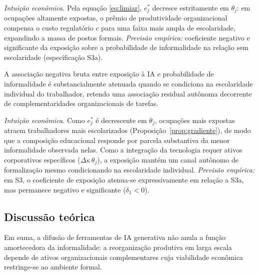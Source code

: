 \textit{Intuição econômica.} Pela equação \eqref{eq:limiar}, $e^*_j$ decresce estritamente em $\theta_j$: em ocupações altamente expostas, o prêmio de produtividade organizacional compensa o custo regulatório $c$ para uma faixa mais ampla de escolaridade, expandindo a massa de postos formais. \emph{Previsão empírica:} coeficiente negativo e significante da exposição sobre a probabilidade de informalidade na relação sem escolaridade (especificação S3a).

\begin{corolario}
\label{cor:mediacao}
A associação negativa bruta entre exposição à IA e probabilidade de informalidade é substancialmente atenuada quando se condiciona na escolaridade individual do trabalhador, retendo uma associação residual autônoma decorrente de complementaridades organizacionais de tarefas.
\end{corolario}

\textit{Intuição econômica.} Como $e_j^*$ é decrescente em $\theta_j$, ocupações mais expostas atraem trabalhadores mais escolarizados (Proposição~\ref{prop:gradiente}), de modo que a composição educacional responde por parcela substantiva da menor informalidade observada nelas. Como a integração da tecnologia requer ativos corporativos específicos ($\Delta\kappa\,\theta_j$), a exposição mantém um canal autônomo de formalização mesmo condicionando na escolaridade individual. \emph{Previsão empírica:} em S3, o coeficiente de exposição atenua-se expressivamente em relação a S3a, mas permanece negativo e significante ($\delta_1 < 0$).

\subsection{Discussão teórica}

Em suma, a difusão de ferramentas de IA generativa não anula a função amortecedora da informalidade: a reorganização produtiva em larga escala depende de ativos organizacionais complementares cuja viabilidade econômica restringe-se ao ambiente formal.
